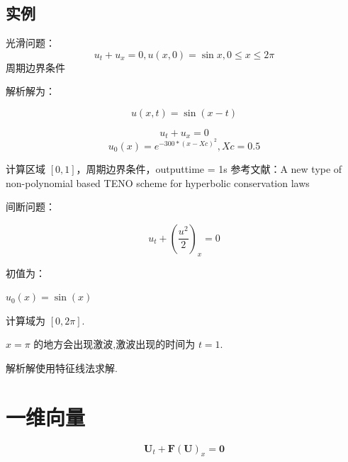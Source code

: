 \documentclass{book}
\begin{document}
\subsection{实例}


\begin{example}{}{}
    光滑问题：
    \begin{equation}
        u_t+u_x=0,u(x,0)=\sin x,0\leqslant x\leqslant 2\pi
    \end{equation}
    周期边界条件


    解析解为：

    \begin{equation}
        u(x,t) = \sin(x-t)
    \end{equation}
\end{example}



\begin{example}
    \begin{equation}
        u_t+u_x=0
    \end{equation}
    \begin{equation}
        u_0(x) = e^{-300*(x-Xc)^2},Xc = 0.5
    \end{equation}

\end{example}
计算区域 $[0,1]$，周期边界条件，outputtime = 1s
参考文献：A new type of non-polynomial based TENO scheme for hyperbolic conservation
laws



\begin{example}{}{}
    间断问题：

    \begin{equation}
        u_{t}+\left(\frac{u^{2}}{2}\right)_{x}=0
    \end{equation}

    初值为：

    $u_0(x)=\sin(x)$

    计算域为 $[0,2\pi]$.

    $x=\pi$ 的地方会出现激波,激波出现的时间为 $t=1$.

    解析解使用特征线法求解.
\end{example}




\section{一维向量}

\begin{equation}
    \mathbf{U}_{t}+\mathbf{F}(\mathbf{U})_{x}=\mathbf{0}
\end{equation}
\end{document}
